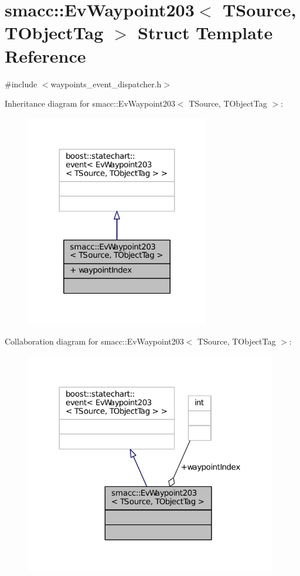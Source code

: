 \hypertarget{structsmacc_1_1EvWaypoint203}{}\section{smacc\+:\+:Ev\+Waypoint203$<$ T\+Source, T\+Object\+Tag $>$ Struct Template Reference}
\label{structsmacc_1_1EvWaypoint203}


{\ttfamily \#include $<$waypoints\+\_\+event\+\_\+dispatcher.\+h$>$}



Inheritance diagram for smacc\+:\+:Ev\+Waypoint203$<$ T\+Source, T\+Object\+Tag $>$\+:
\nopagebreak
\begin{figure}[H]
\begin{center}
\leavevmode
\includegraphics[width=227pt]{structsmacc_1_1EvWaypoint203__inherit__graph}
\end{center}
\end{figure}


Collaboration diagram for smacc\+:\+:Ev\+Waypoint203$<$ T\+Source, T\+Object\+Tag $>$\+:
\nopagebreak
\begin{figure}[H]
\begin{center}
\leavevmode
\includegraphics[width=312pt]{structsmacc_1_1EvWaypoint203__coll__graph}
\end{center}
\end{figure}
